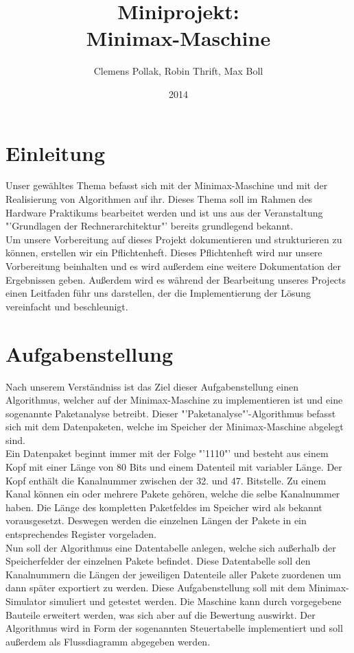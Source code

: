 \documentclass[12pt,titlepage]{article}
\begin{document}
\title{Miniprojekt: \\ Minimax-Maschine}
\author{Clemens Pollak, Robin Thrift, Max Boll}
\date{2014}
\maketitle


\section{Einleitung} 
Unser gew{\"a}hltes Thema befasst sich mit der Minimax-Maschine und mit der Realisierung von Algorithmen auf ihr. Dieses Thema soll im Rahmen des Hardware Praktikums bearbeitet werden und ist uns aus der Veranstaltung "'Grundlagen der Rechnerarchitektur"' bereits grundlegend bekannt.\\ Um unsere Vorbereitung auf dieses Projekt dokumentieren und strukturieren zu k{\"o}nnen, erstellen wir ein Pflichtenheft. Dieses Pflichtenheft wird nur unsere Vorbereitung beinhalten und es wird au{\ss}erdem eine weitere Dokumentation der Ergebnissen geben. Außerdem wird es w{\"a}hrend der Bearbeitung unseres Projects einen Leitfaden führ uns darstellen, der die Implementierung der L{\"o}sung vereinfacht und beschleunigt.

\section{Aufgabenstellung}
Nach unserem Verst{\"a}ndniss ist das Ziel dieser Aufgabenstellung einen Algorithmus, welcher auf der Minimax-Maschine zu implementieren ist und eine sogenannte Paketanalyse betreibt. Dieser "'Paketanalyse"'-Algorithmus befasst sich mit dem Datenpaketen, welche im Speicher der Minimax-Maschine abgelegt sind.\\ Ein Datenpaket beginnt immer mit der Folge "'1110"' und besteht aus einem
Kopf mit einer L{\"a}nge von 80 Bits und einem Datenteil mit variabler L{\"a}nge. Der Kopf enth{\"a}lt die Kanalnummer zwischen der 32. und 47. Bitstelle. Zu einem Kanal k{\"o}nnen ein oder mehrere Pakete geh{\"o}ren, welche die selbe Kanalnummer haben.
Die L{\"a}nge des kompletten Paketfeldes im Speicher wird als bekannt vorausgesetzt. Deswegen werden die einzelnen L{\"a}ngen der Pakete in ein entsprechendes Register vorgeladen.\\
Nun soll der Algorithmus eine Datentabelle anlegen, welche sich au{\ss}erhalb der Speicherfelder der einzelnen Pakete befindet. Diese Datentabelle soll den Kanalnummern die L{\"a}ngen der jeweiligen Datenteile aller Pakete zuordenen um dann später exportiert zu werden. Diese Aufgabenstellung soll mit dem Minimax-Simulator simuliert und getestet werden. Die Maschine kann durch vorgegebene Bauteile erweitert werden, was sich aber auf die Bewertung auswirkt. Der Algorithmus wird in Form der sogenannten Steuertabelle implementiert und soll außerdem als Flussdiagramm abgegeben werden.
\end{document}
